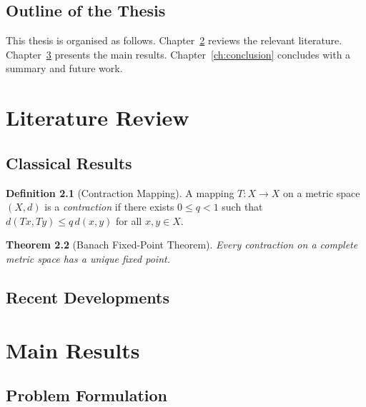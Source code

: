 \documentclass[12pt, a4paper, oneside]{book}
\theoremstyle{plain}
\newtheorem{theorem}{Theorem}[chapter]
\theoremstyle{definition}
\newtheorem{definition}[theorem]{Definition}
\begin{document}
\section{Outline of the Thesis}
\label{sec:outline}
This thesis is organised as follows.
Chapter~\ref{ch:literature} reviews the relevant literature.
Chapter~\ref{ch:main_results} presents the main results.
Chapter~\ref{ch:conclusion} concludes with a summary and future work.

\chapter{Literature Review}
\label{ch:literature}

% 

\section{Classical Results}
\label{sec:classical}
\lipsum[5]

\begin{definition}[Contraction Mapping]
    \label{def:contraction}
    A mapping $T \colon X \to X$ on a metric space $(X, d)$ is a
    \emph{contraction} if there exists $0 \leq q < 1$ such that
    $d(Tx, Ty) \leq q \, d(x, y)$ for all $x, y \in X$.
\end{definition}

\begin{theorem}[Banach Fixed-Point Theorem]
    \label{thm:banach}
    Every contraction on a complete metric space has a unique fixed point.
\end{theorem}

\section{Recent Developments}
\label{sec:recent}
\lipsum[6-7]

\chapter{Main Results}
\label{ch:main_results}

% 

\section{Problem Formulation}
\label{sec:formulation}
\lipsum[8]
\end{document}
